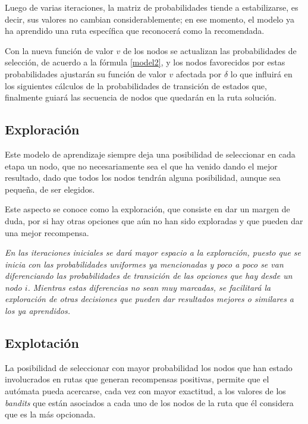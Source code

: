 
Luego de varias iteraciones, la matriz de probabilidades tiende a estabilizarse, es decir, sus valores no cambian considerablemente; en ese momento, el modelo ya ha aprendido una ruta específica que reconocerá como la recomendada.

Con la nueva función de valor $v$ de los nodos se actualizan las probabilidades de selección, de acuerdo a la fórmula \ref{model2}, y los nodos favorecidos por estas probabilidades ajustarán su función de valor $v$ afectada por $\delta$ lo que influirá en los siguientes cálculos de la probabilidades de transición de estados que, finalmente guiará las secuencia de nodos que quedarán en la ruta solución.


\subsection{Exploración}
Este modelo de aprendizaje siempre deja una posibilidad de seleccionar en cada etapa un nodo, que no necesariamente sea el que ha venido dando el mejor resultado, dado que todos los nodos tendrán alguna posibilidad, aunque sea pequeña, de ser elegidos.

Este aspecto se conoce como la exploración, que consiste en dar un margen de duda, por si hay otras opciones que aún no han sido exploradas y que pueden dar una mejor recompensa.

\textit{En las iteraciones iniciales se dará mayor espacio a la exploración, puesto que se inicia con las probabilidades uniformes ya mencionadas y poco a poco se van diferenciando las probabilidades de transición de las opciones que hay desde un nodo $i$. Mientras estas diferencias no sean muy marcadas, se facilitará la exploración de otras decisiones que pueden dar resultados mejores o similares a los ya aprendidos.}

\subsection{Explotación}
La posibilidad de seleccionar con mayor probabilidad los nodos que han estado involucrados en rutas que generan recompensas positivas, permite que el autómata pueda acercarse, cada vez con mayor exactitud, a los valores de los \textit{bandits} que están asociados a cada uno de los nodos de la ruta que él considera que es la más opcionada.

